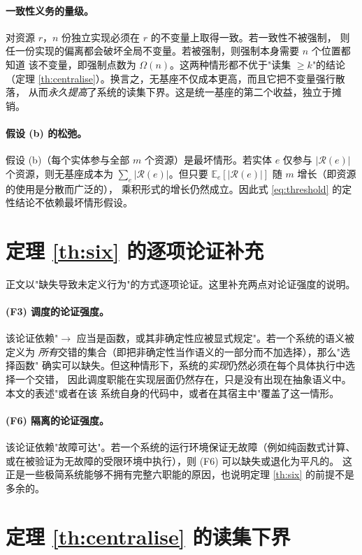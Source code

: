 \paragraph{一致性义务的量级。}
对资源 $r$，$n$ 份独立实现必须在 $r$ 的不变量上取得一致。若一致性不被强制，
则任一份实现的偏离都会破坏全局不变量。若被强制，则强制本身需要 $n$ 个位置都知道
该不变量，即强制点数为 $\Omega(n)$。这两种情形都不优于"读集 $\ge k$"的结论
（定理 \ref{th:centralise}）。换言之，无基座不仅成本更高，而且它把不变量强行散落，
从而\emph{永久提高}了系统的读集下界。这是统一基座的第二个收益，独立于摊销。

\paragraph{假设 (b) 的松弛。}
假设 (b)（每个实体参与全部 $m$ 个资源）是最坏情形。若实体 $e$ 仅参与
$|\mathcal{R}(e)|$ 个资源，则无基座成本为 $\sum_e |\mathcal{R}(e)|$。但只要
$\mathbb{E}_e[|\mathcal{R}(e)|]$ 随 $m$ 增长（即资源的使用是分散而广泛的），
乘积形式的增长仍然成立。因此式 \eqref{eq:threshold} 的定性结论不依赖最坏情形假设。

\section{定理 \ref{th:six} 的逐项论证补充}

正文以"缺失导致未定义行为"的方式逐项论证。这里补充两点对论证强度的说明。

\paragraph{(F3) 调度的论证强度。}
该论证依赖"$\to$ 应当是函数，或其非确定性应被显式规定"。若一个系统的语义被定义为
\emph{所有}交错的集合（即把非确定性当作语义的一部分而不加选择），那么"选择函数"
确实可以缺失。但这种情形下，系统的\emph{实现}仍然必须在每个具体执行中选择一个交错，
因此调度职能在实现层面仍然存在，只是没有出现在抽象语义中。本文的表述"或者在该
系统自身的代码中，或者在其宿主中"覆盖了这一情形。

\paragraph{(F6) 隔离的论证强度。}
该论证依赖"故障可达"。若一个系统的运行环境保证无故障（例如纯函数式计算、
或在被验证为无故障的受限环境中执行），则 (F6) 可以缺失或退化为平凡的。
这正是一些极简系统能够不拥有完整六职能的原因，也说明定理 \ref{th:six} 的前提不是
多余的。

\section{定理 \ref{th:centralise} 的读集下界}

